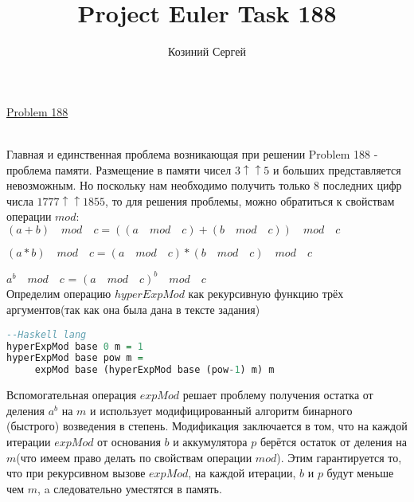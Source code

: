 \documentclass[11pt,a4paper]{article}
\title{Project Euler Task 188}
\author{Козиний Сергей}
\begin{document}
    
\maketitle
\href{''https://projecteuler.net/problem=188''}{Problem 188}

\\



Главная и единственная проблема возникающая при решении Problem 188 - проблема памяти. Размещение в памяти чисел  ${3 ↑↑ 5}$ и больших представляется невозможным. Но поскольку нам необходимо получить только 8 последних цифр числа $1777 ↑↑ 1855$, то для решения проблемы, можно обратиться к свойствам операции $mod$:\\

$ (a+b) \quad mod \quad c = ( (a \quad mod \quad c) + (b \quad mod \quad c) )\quad mod \quad c $

$ (a*b) \quad  mod \quad c =  (a \quad mod \quad c) * (b \quad mod \quad c) \quad mod \quad c $

$ a^b \quad mod \quad c $ =  $ (a \quad mod \quad  c)^b  \quad mod \quad c $ \\

Определим операцию $hyperExpMod$ как рекурсивную функцию трёх аргументов(так как она была дана в тексте задания)

\begin{lstlisting}[language=Haskell]
--Haskell lang
hyperExpMod base 0 m = 1
hyperExpMod base pow m =
     expMod base (hyperExpMod base (pow-1) m) m
\end{lstlisting}

Вспомогательная операция ${expMod}$ решает проблему получения остатка от деления $a^b$ на $m$ и использует модифицированный алгоритм бинарного (быстрого) возведения в степень.
Модификация заключается в том, что на каждой итерации $expMod$ от основания $b$ и аккумулятора $p$ берётся остаток от деления на $m$(что имеем право делать по свойствам операции $mod$). Этим гарантируется то, что при рекурсивном вызове $expMod$, на каждой итерации, $b$ и $p$ будут меньше чем $m$, a следовательно уместятся в память.
\end{document}
